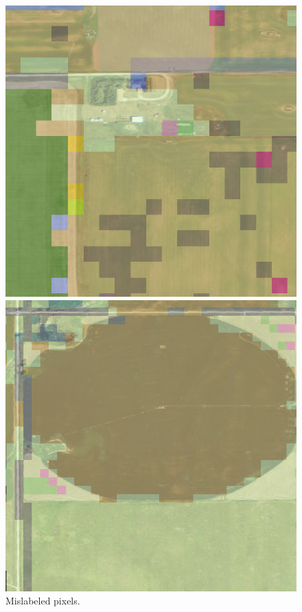 \documentclass[12pt]{article}
\begin{document}
\begin{center}
  \begin{framed}
  \end{framed}
  \begin{figure}[!htb]
      \includegraphics[width=\linewidth]{images/poor_labels_1.png}
      \caption{Mislabeled pixels.}
    \endminipage\hfill
      \includegraphics[width=\linewidth]{images/poor_labels_2.png}

\end{figure}
\end{center}
\end{document}
